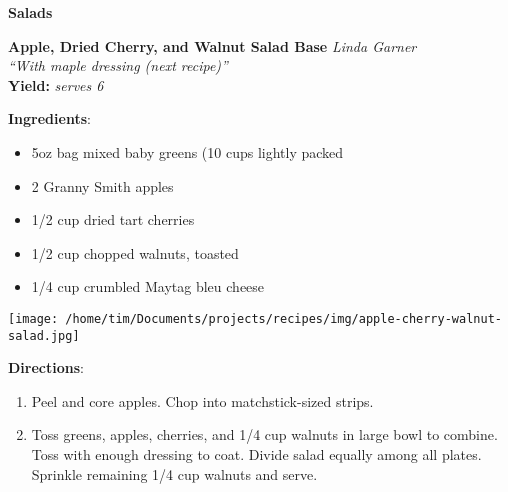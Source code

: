 \documentclass[11pt, twoside, openany]{book}
\begin{document}
{\newpage \LARGE \textbf{Salads}} \label{salads}\vspace{4mm}\\
\noindent\begin{minipage}[t]{\linewidth}%
{\Large\textbf{Apple, Dried Cherry, and Walnut Salad Base}} \label{apple,-dried-cherry,-and-walnut-salad-base}\hfill\textit{Linda Garner}\\
\textit{``With maple dressing (next recipe)''}\\
\textbf{Yield:} \textit{serves 6}\\
\noindent\begin{minipage}[t]{0.78\linewidth}%
\textbf{Ingredients}:\vspace{-3mm}
\begin{multicols}{2}
\begin{itemize}\setlength\itemsep{-1mm}
\item 5oz bag mixed baby greens (10 cups lightly packed
\item 2 Granny Smith apples
\item 1/2 cup dried tart cherries
\item 1/2 cup chopped walnuts, toasted
\item 1/4 cup crumbled Maytag bleu cheese
\end{itemize}
\end{multicols}
\end{minipage}
\noindent\begin{minipage}[t]{0.18\linewidth}
\centering \strut\vspace*{-\baselineskip}\newline
\texttt{[image: /home/tim/Documents/projects/recipes/img/apple-cherry-walnut-salad.jpg]}\\
\end{minipage}\vspace{3mm}
\textbf{Directions}:
\vspace{-3mm}\begin{enumerate}\setlength\itemsep{-1mm}
\item Peel and core apples. Chop into matchstick-sized strips.
\item Toss greens, apples, cherries, and 1/4 cup walnuts in large bowl to combine. Toss with enough dressing to coat. Divide salad equally among all plates. Sprinkle remaining 1/4 cup walnuts and serve.
\end{enumerate}
\end{minipage}\vspace{8mm}
\end{document}
